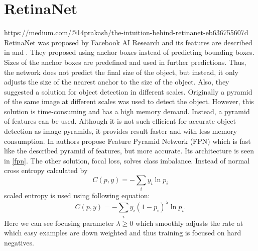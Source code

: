\documentclass[twoside]{ctuthesis}
\theoremstyle{plain}
\theoremstyle{definition}
\theoremstyle{note}
\begin{document}
\section{RetinaNet}
https://medium.com/@14prakash/the-intuition-behind-retinanet-eb636755607d
RetinaNet was proposed by Facebook AI Research and its features are described in \cite{lin_dollar_girshick_he_hariharan_belongie_2017} and \cite{lin_goyal_girshick_he_dollar_2017}. 
They proposed using anchor boxes instead of predicting bounding boxes. Sizes of the anchor boxes are predefined and used in further predictions. Thus, the network does not predict the final size of the object, but instead, it only adjusts the size of the nearest anchor to the size of the object. 
Also, they suggested a solution for object detection in different scales. Originally a pyramid of the same image at different scales was used to detect the object. However, this solution is time-consuming and has a high memory demand. Instead, a pyramid of features can be used. Although it is not such efficient for accurate object detection as image pyramids, it provides result faster and with less memory consumption. In \cite{lin_dollar_girshick_he_hariharan_belongie_2017} authors propose Feature Pyramid Network (FPN) which is fast like the described pyramid of features, but more accurate. Its architecture is seen in \ref{fpn}.
The other solution, focal loss, solves class imbalance. Instead of normal cross entropy calculated by 
\begin{equation}
C(p, y) = -\sum_{i}y_i \ln p_i
\end{equation}  
scaled entropy is used using following equation:
\begin{equation}
C(p,y)=-\sum_i y_i(1-p_i)^{\lambda}\ln p_i.
\end{equation}
Here we can see focusing parameter $\lambda \geq 0$ which smoothly adjusts the rate at which easy examples are down weighted and thus training is focused on hard negatives. 
\end{document}
